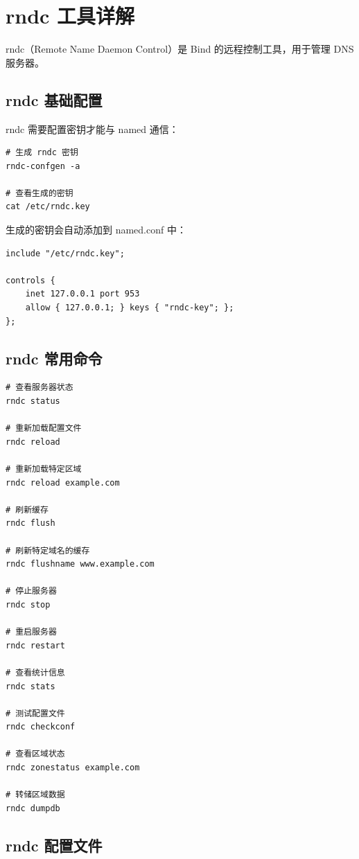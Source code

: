 \documentclass[12pt,UTF8]{ctexbook}
\begin{document}
\chapter{rndc 工具详解}
\label{chap:rndc}

rndc（Remote Name Daemon Control）是 Bind 的远程控制工具，用于管理 DNS 服务器。

\section{rndc 基础配置}
\label{sec:rndc_config}

rndc 需要配置密钥才能与 named 通信：

\begin{verbatim}
# 生成 rndc 密钥
rndc-confgen -a

# 查看生成的密钥
cat /etc/rndc.key
\end{verbatim}

生成的密钥会自动添加到 named.conf 中：
\begin{verbatim}
include "/etc/rndc.key";

controls {
    inet 127.0.0.1 port 953
    allow { 127.0.0.1; } keys { "rndc-key"; };
};
\end{verbatim}

\section{rndc 常用命令}
\label{sec:rndc_commands}

\begin{verbatim}
# 查看服务器状态
rndc status

# 重新加载配置文件
rndc reload

# 重新加载特定区域
rndc reload example.com

# 刷新缓存
rndc flush

# 刷新特定域名的缓存
rndc flushname www.example.com

# 停止服务器
rndc stop

# 重启服务器
rndc restart

# 查看统计信息
rndc stats

# 测试配置文件
rndc checkconf

# 查看区域状态
rndc zonestatus example.com

# 转储区域数据
rndc dumpdb
\end{verbatim}

\section{rndc 配置文件}
\label{sec:rndc_conf_file}
\end{document}
